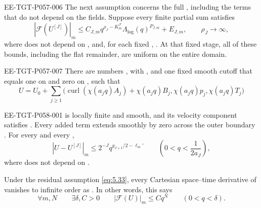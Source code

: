 \begin{EESegment}{EE-TGT-P057-006}
The next assumption concerns the full , including the terms that do not depend on the
fields. Suppose every finite partial sum satisfies
\begin{equation}
 |\mathcal F(U^{[J]})|_m
 \leq C_{J,m}q^{\rho_J-K_m^{\mathcal F}}\Lambda_{\log}(q)^{P_{J,m}}+E_{J,m},
 \qquad \rho_J\longrightarrow\infty,
 \tag{5.33}\label{eq:5.33}
\end{equation}
where  does not depend on , and, for each fixed
,
. At that fixed stage, all of these bounds, including the flat
remainder, are uniform on the entire domain.
\end{EESegment}

\begin{lemma}\label{lem:5.4}
\begin{EESegment}{EE-TGT-P057-007}
There are numbers , with
, and one fixed smooth cutoff  that equals one on
 and zero on \NSi{NS-F-P057-053}{[1,\infty)}, such that
\begin{equation}
 U=U_0+\sum_{j\geq1}
 \bigl(\operatorname{curl}(\chi(a_jq)A_j)+\chi(a_jq)B_j,
       \chi(a_jq)p_j,\chi(a_jq)T_j\bigr)
 \tag{5.34}\label{eq:5.34}
\end{equation}
\end{EESegment}

%
\begin{EESegment}{EE-TGT-P058-001}
is locally finite and smooth, and its velocity component  satisfies
. Every added term extends smoothly by zero across the outer boundary
. For every  and every
,
\begin{equation}
 |U-U^{[J]}|_m\leq2^{-J}q^{g_{J+1}/2-\ell_m'}
 \qquad\left(0<q<\frac1{2a_J}\right),
 \tag{5.35}\label{eq:5.35}
\end{equation}
where  does not depend on .

Under the residual assumption \eqref{eq:5.33}, every Cartesian space--time derivative of
 vanishes to infinite order as . In other words,
this says
\begin{equation}
 \forall m,N\qquad\exists\delta,C>0\qquad
 |\mathcal F(U)|_m\leq Cq^N
 \qquad(0<q<\delta).
 \tag{5.36}\label{eq:5.36}
\end{equation}
\end{EESegment}
\end{lemma}

